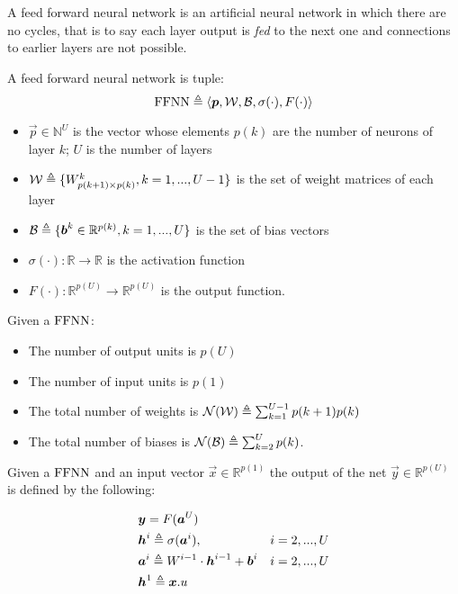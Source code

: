 
A feed forward neural network is an artificial neural network in which there are no cycles, that is to say each layer output is \textit{fed} to the 
next one and connections to earlier layers are not possible. 


\begin{defn}
\label{def_ffnn}
A feed forward neural network is tuple:
$$\mathrm{FFNN}\triangleq \langle\boldsymbol{p},\mathcal{W},\mathcal{B},\sigma(\cdot),F(\cdot)\rangle$$
\begin{itemize}
 \item $\vec{p} \in \mathbb{N}^U$ is the vector whose elements $p(k)$ are the number of neurons of layer $k$; $U$ is the number of layers
 \item $\mathcal{W} \triangleq \{W^k_{p(k+1) \times p(k)}, k=1,...,U-1 \}$ is the set of weight matrices of each layer
 \item $\mathcal{B} \triangleq \{\boldsymbol{b}^k \in \mathbb{R}^{p(k)}, k=1,...,U \} $ is the set of bias vectors
 \item $\sigma(\cdot): \mathbb{R}\rightarrow \mathbb{R}$ is the activation function
 \item $F(\cdot): \mathbb{R}^{p(U)}\rightarrow \mathbb{R}^{p(U)}$ is the output function.
\end{itemize}
\end{defn}

\begin{remark}{}
Given a $\mathrm{FFNN}$:
\begin{itemize}
 \item The number of output units is $p(U)$
 \item The number of input units is $p(1)$
 \item The total number of weights is $\mathcal{N}(\mathcal{W}) \triangleq \sum_{k=1}^{U-1} p(k+1)p(k)$
 \item The total number of biases is $\mathcal{N}(\mathcal{B}) \triangleq \sum_{k=2}^{U} p(k)$.
\end{itemize}
\end{remark}

\begin{defn}
Given a $\mathrm{FFNN}$ and an input vector $\vec{x} \in \mathbb{R}^{p(1)}$ the output of the net $\vec{y} \in \mathbb{R}^{p(U)}$  is defined by the following:

\begin{align}
&\boldsymbol{y}=F(\boldsymbol{a}^{U}) &\\
&\boldsymbol{h}^{i} \triangleq \sigma(\boldsymbol{a}^{i}), & i=2,...,U\\
&\boldsymbol{a}^{i} \triangleq W^{i-1} \cdot \boldsymbol{h}^{i-1} +\boldsymbol{b}^i  & i=2,...,U\\
&\boldsymbol{h}^{1} \triangleq \boldsymbol{x}.u &
\end{align}
\end{defn}

